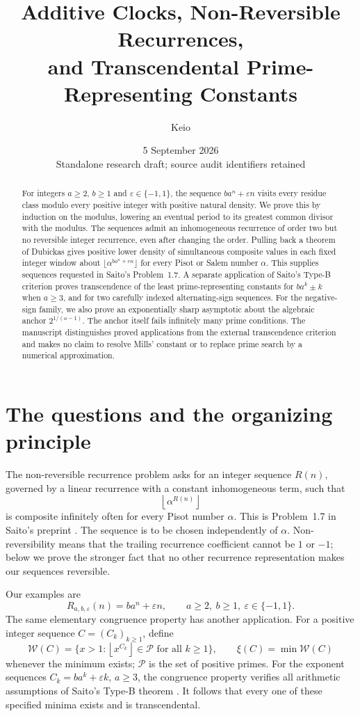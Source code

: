 \documentclass[11pt,a4paper]{article}
\author{Keio}
\date{5 September 2026\\\small Standalone research draft; source audit identifiers retained}
\title{Additive Clocks, Non-Reversible Recurrences,\\ and Transcendental Prime-Representing Constants}
\theoremstyle{definition}\newtheorem{definition}[theorem]{Definition}
\theoremstyle{remark}\newtheorem{remark}[theorem]{Remark}
\newcommand{\floor}[1]{\left\lfloor #1\right\rfloor}\newcommand{\ceil}[1]{\left\lceil #1\right\rceil}
\newcommand{\PP}{\mathcal P}
\newcommand{\WW}{\mathcal W}
\begin{document}
\maketitle
\begin{abstract}
For integers $a\ge2$, $b\ge1$ and $\varepsilon\in\{-1,1\}$, the
sequence $ba^n+\varepsilon n$ visits every residue class modulo every
positive integer with positive natural density. We prove this by
induction on the modulus, lowering an eventual period to its greatest
common divisor with the modulus. The sequences admit an inhomogeneous
recurrence of order two but no reversible integer recurrence, even
after changing the order. Pulling back a theorem of Dubickas gives
positive lower density of simultaneous composite values in each fixed
integer window about $\lfloor\alpha^{ba^n+\varepsilon n}\rfloor$ for
every Pisot or Salem number $\alpha$. This supplies sequences requested
in Saito's Problem~1.7. A separate application of Saito's Type-B
criterion proves transcendence of the least prime-representing
constants for $ba^k\pm k$ when $a\ge3$, and for two carefully indexed
alternating-sign sequences. For the negative-sign family, we also
prove an exponentially sharp asymptotic about the algebraic anchor
$2^{1/(a-1)}$. The anchor itself fails infinitely many prime conditions.
The manuscript distinguishes proved applications from the external
transcendence criterion and makes no claim to resolve Mills'
constant or to replace prime search by a numerical approximation.
\end{abstract}

\section{The questions and the organizing principle}
The non-reversible recurrence problem asks for an integer sequence
$R(n)$, governed by a linear recurrence with a constant inhomogeneous
term, such that
\[
 \floor{\alpha^{R(n)}}
\]
is composite infinitely often for every Pisot number $\alpha$.
This is Problem~1.7 in Saito's preprint \cite{SaitoIntervals}. The
sequence is to be chosen independently of $\alpha$. Non-reversibility
means that the trailing recurrence coefficient cannot be $1$ or
$-1$; below we prove the stronger fact that no other recurrence
representation makes our sequences reversible.

Our examples are
\begin{equation}\label{eq:clock}
 R_{a,b,\varepsilon}(n)=ba^n+\varepsilon n,
 \qquad a\ge2,\ b\ge1,\ \varepsilon\in\{-1,1\}.
\end{equation}
The same elementary congruence property has another application.
For a positive integer sequence $C=(C_k)_{k\ge1}$, define
\begin{equation}\label{eq:Wdef}
 \WW(C)=\{x>1:\floor{x^{C_k}}\in\PP\text{ for all }k\ge1\},
 \qquad \xi(C)=\min\WW(C)
\end{equation}
whenever the minimum exists; $\PP$ is the set of positive primes.
For the exponent sequences $C_k=ba^k+\varepsilon k$, $a\ge3$, the
congruence property verifies all arithmetic assumptions of Saito's
Type-B theorem \cite{SaitoVariants}. It follows that every one of these
specified minima exists and is transcendental.
\end{document}
